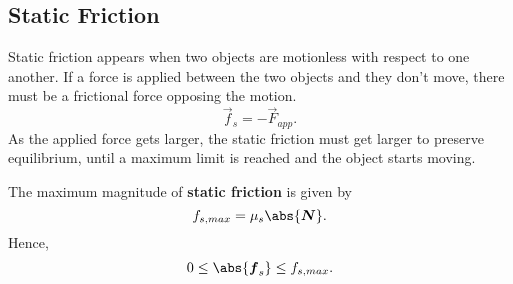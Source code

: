 \documentclass[../classical_mechanics.tex]{subfiles}
\begin{document}
        \subsection{Static Friction}\label{subsec:static-friction}
            Static friction appears when two objects are motionless with respect to one another.
            If a force is applied between the two objects and they don't move, there must be a frictional force opposing the motion.
            \begin{equation}
                \vec{f}_s=-\vec{F}_{app}.
            \end{equation}
            As the applied force gets larger, the static friction must get larger to preserve equilibrium, until a maximum limit is reached and the object starts moving.
            \begin{definition}
                The maximum magnitude of \textbf{static friction} is given by
                \begin{equation}
                    f_{s,max}=\mu_s\abs{\vec{N}}.
                \end{equation}
                Hence,
                \begin{equation}
                    0\leq\abs{\vec{f}_s}\leq f_{s,max}.
                \end{equation}
            \end{definition}
\end{document}
